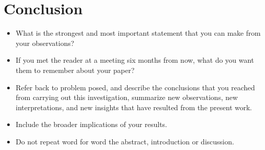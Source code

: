\chapter{Conclusion}
\begin{itemize}
\item What is the strongest and most important statement that you can make from your observations?
\item If you met the reader at a meeting six months from now, what do you want them to remember about your paper?
\item Refer back to problem posed, and describe the conclusions that you reached from carrying out this investigation, summarize new observations, new interpretations, and new insights that have resulted from the present work.
\item Include the broader implications of your results.
\item Do not repeat word for word the abstract, introduction or discussion.
\end{itemize}
